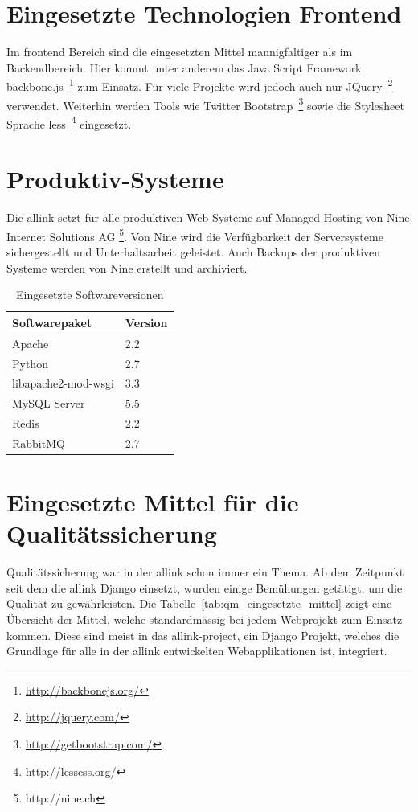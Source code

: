 \section{Eingesetzte Technologien Frontend}
\label{sec:eingesetzte_technologien_frontend}
Im frontend Bereich sind die eingesetzten Mittel mannigfaltiger als im Backendbereich. Hier kommt unter anderem das  Java Script Framework backbone.js~\footnote{\url{http://backbonejs.org/}} zum Einsatz. Für viele Projekte wird jedoch auch nur JQuery~\footnote{\url{http://jquery.com/}} verwendet. Weiterhin werden Tools wie Twitter Bootstrap~\footnote{\url{http://getbootstrap.com/}} sowie die Stylesheet Sprache less~\footnote{\url{http://lesscss.org/}} eingesetzt.

\section{Produktiv-Systeme}
\label{sec:produktiv_systeme}
Die allink setzt für alle produktiven Web Systeme auf Managed Hosting von Nine Internet Solutions AG \footnote{http://nine.ch}. Von Nine wird die Verfügbarkeit der Serversysteme sichergestellt und Unterhaltsarbeit geleistet. Auch Backups der produktiven Systeme werden von Nine erstellt und archiviert.

\begin{table}[ht]
  \centering
  \begin{tabular}{ll}
  \toprule
    \textbf{Softwarepaket} & \textbf{Version}\\
  \midrule
    Apache & 2.2\\
  \hline
    Python & 2.7\\
  \hline
    libapache2-mod-wsgi & 3.3\\
  \hline
    MySQL Server & 5.5\\
  \hline
    Redis & 2.2\\
  \hline
    RabbitMQ & 2.7\\
  \bottomrule
  \end{tabular}
  \caption{Eingesetzte Softwareversionen}
  \label{tab:eingesetzte_softwareversionen}
\end{table}

\section{Eingesetzte Mittel für die Qualitätssicherung}
\label{sec:eingesetzte_mittel_für_die_qualitätssicherung}
Qualitätssicherung war in der allink schon immer ein Thema. Ab dem Zeitpunkt seit dem die allink Django einsetzt, wurden einige Bemühungen getätigt, um die Qualität zu gewährleisten. Die Tabelle~\ref{tab:qm_eingesetzte_mittel} zeigt eine Übersicht der Mittel, welche standardmässig bei jedem Webprojekt zum Einsatz kommen. Diese sind meist in das allink-project, ein Django Projekt, welches die Grundlage für alle in der allink entwickelten Webapplikationen ist, integriert.

